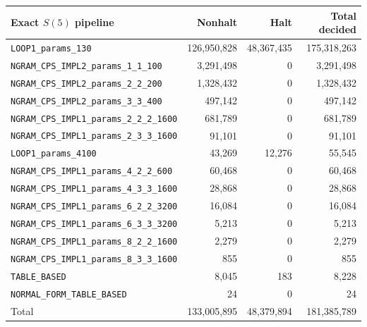 \documentclass[a4paper,british]{article}
\theoremstyle{definition} %
\numberwithin{equation}{section}
\theoremstyle{definition} %
\begin{document}
\begin{table}[h!]
    \centering
    \begin{tabular}{|lrrr|}
        \hline
        Exact $S(5)$ pipeline                             & Nonhalt         & Halt           & Total decided   \\
        \hline
        \texttt{LOOP1\_params\_130}                       & 126{,}950{,}828 & 48{,}367{,}435 & 175{,}318{,}263 \\
        \texttt{NGRAM\_CPS\_IMPL2\_params\_1\_1\_100}     & 3{,}291{,}498   & 0              & 3{,}291{,}498   \\
        \texttt{NGRAM\_CPS\_IMPL2\_params\_2\_2\_200}     & 1{,}328{,}432   & 0              & 1{,}328{,}432   \\
        \texttt{NGRAM\_CPS\_IMPL2\_params\_3\_3\_400}     & 497{,}142       & 0              & 497{,}142       \\
        \texttt{NGRAM\_CPS\_IMPL1\_params\_2\_2\_2\_1600} & 681{,}789       & 0              & 681{,}789       \\
        \texttt{NGRAM\_CPS\_IMPL1\_params\_2\_3\_3\_1600} & 91{,}101        & 0              & 91{,}101        \\
        \texttt{LOOP1\_params\_4100}                      & 43{,}269        & 12{,}276       & 55{,}545        \\
        \texttt{NGRAM\_CPS\_IMPL1\_params\_4\_2\_2\_600}  & 60{,}468        & 0              & 60{,}468        \\
        \texttt{NGRAM\_CPS\_IMPL1\_params\_4\_3\_3\_1600} & 28{,}868        & 0              & 28{,}868        \\
        \texttt{NGRAM\_CPS\_IMPL1\_params\_6\_2\_2\_3200} & 16{,}084        & 0              & 16{,}084        \\
        \texttt{NGRAM\_CPS\_IMPL1\_params\_6\_3\_3\_3200} & 5{,}213         & 0              & 5{,}213         \\
        \texttt{NGRAM\_CPS\_IMPL1\_params\_8\_2\_2\_1600} & 2{,}279         & 0              & 2{,}279         \\
        \texttt{NGRAM\_CPS\_IMPL1\_params\_8\_3\_3\_1600} & 855             & 0              & 855             \\
        \texttt{TABLE\_BASED}                             & 8{,}045         & 183            & 8{,}228         \\
        \texttt{NORMAL\_FORM\_TABLE\_BASED}               & 24              & 0              & 24              \\
        \hline
        Total                                             & 133{,}005{,}895 & 48{,}379{,}894 & 181{,}385{,}789 \\
        \hline
    \end{tabular}
\end{table}
\end{document}
